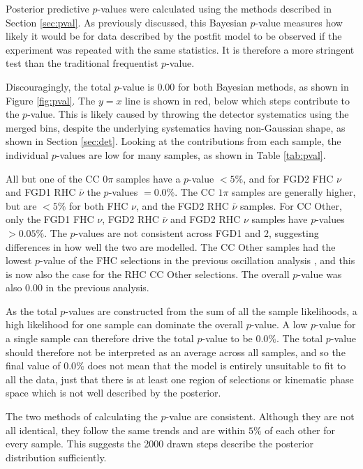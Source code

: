 Posterior predictive $p$-values were calculated using the methods described in Section \ref{sec:pval}. As previously discussed, this Bayesian $p$-value measures how likely it would be for data described by the postfit model to be observed if the experiment was repeated with the same statistics. It is therefore a more stringent test than the traditional frequentist $p$-value.

Discouragingly, the total $p$-value is 0.00 for both Bayesian methods, as shown in Figure \ref{fig:pval}. The $y=x$ line is shown in red, below which steps contribute to the $p$-value. This is likely caused by throwing the detector systematics using the merged bins, despite the underlying systematics having non-Gaussian shape, as shown in Section \ref{sec:det}. Looking at the contributions from each sample, the individual $p$-values are low for many samples, as shown in Table \ref{tab:pval}. 

All but one of the CC 0$\pi$ samples have a $p$-value $<5\%$, and for FGD2 FHC $\nu$ and FGD1 RHC $\bar{\nu}$ the $p$-values $=0.0\%$. The CC $1\pi$ samples are generally higher, but are $<5\%$ for both FHC $\nu$, and the FGD2 RHC $\bar{\nu}$ samples. For CC Other, only the FGD1 FHC $\nu$, FGD2 RHC $\bar{\nu}$ and FGD2 RHC $\nu$ samples have $p$-values $>0.05\%$. The $p$-values are not consistent across FGD1 and 2, suggesting differences in how well the two are modelled. The CC Other samples had the lowest $p$-value of the FHC selections in the previous oscillation analysis \cite{tn324}, and this is now also the case for the RHC CC Other selections. The overall $p$-value was also 0.00 in the previous analysis.

As the total $p$-values are constructed from the sum of all the sample likelihoods, a high likelihood for one sample can dominate the overall $p$-value. A low $p$-value for a single sample can therefore drive the total $p$-value to be 0.0$\%$. The total $p$-value should therefore not be interpreted as an average across all samples, and so the final value of 0.0$\%$ does not mean that the model is entirely unsuitable to fit to all the data, just that there is at least one region of selections or kinematic phase space which is not well described by the posterior.

The two methods of calculating the $p$-value are consistent. Although they are not all identical, they follow the same trends and are within $5\%$ of each other for every sample. This suggests the 2000 drawn steps describe the posterior distribution sufficiently.

